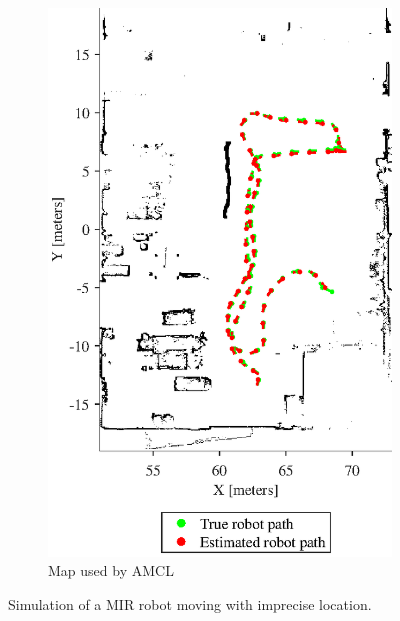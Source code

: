 \begin{figure}[htbp]
\begin{subfigure}[t]{0.45\textwidth}
		\label{fig:simulated_small_world}
	\end{subfigure}
	\begin{subfigure}[t]{0.45\textwidth}
		\includegraphics[width=\textwidth]{figures/static_mapping/simulation_poses_amcl_map}
		\caption{Map used by AMCL}
		\label{fig:simulated_small_amcl_map}
	\end{subfigure}
	\caption{Simulation of a MIR robot moving with imprecise location.}
	\label{fig:test_map_setup}
\end{figure}

